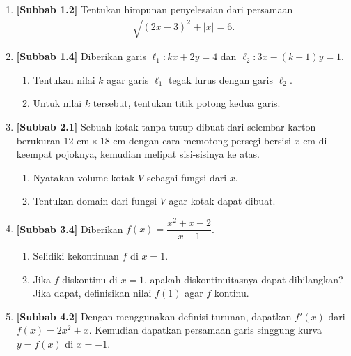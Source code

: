 \documentclass[10pt,openany,a4paper]{article}
\theoremstyle{definition}
\theoremstyle{definition}
\theoremstyle{plain}
\begin{document}
\begin{enumerate}
    \item \textbf{[Subbab 1.2]} Tentukan himpunan penyelesaian dari persamaan
    \begin{align*}
        \sqrt{(2x-3)^2}+|x|=6.
    \end{align*}

    \item \textbf{[Subbab 1.4]} Diberikan garis $\ell_1: kx+2y=4$ dan $\ell_2: 3x-(k+1)y=1$.
    \begin{enumerate}
        \item Tentukan nilai $k$ agar garis $\ell_1$ tegak lurus dengan garis $\ell_2$.
        \item Untuk nilai $k$ tersebut, tentukan titik potong kedua garis.
    \end{enumerate}

    \item \textbf{[Subbab 2.1]} Sebuah kotak tanpa tutup dibuat dari selembar karton berukuran $12\text{ cm}\times 18\text{ cm}$ dengan cara memotong persegi bersisi $x$ cm di keempat pojoknya, kemudian melipat sisi-sisinya ke atas.
    \begin{enumerate}
        \item Nyatakan volume kotak $V$ sebagai fungsi dari $x$.
        \item Tentukan domain dari fungsi $V$ agar kotak dapat dibuat.
    \end{enumerate}

    \item \textbf{[Subbab 3.4]} Diberikan $f(x)=\dfrac{x^2+x-2}{x-1}$.
    \begin{enumerate}
        \item Selidiki kekontinuan $f$ di $x=1$.
        \item Jika $f$ diskontinu di $x=1$, apakah diskontinuitasnya dapat dihilangkan? Jika dapat, definisikan nilai $f(1)$ agar $f$ kontinu.
    \end{enumerate}

    \item \textbf{[Subbab 4.2]} Dengan menggunakan definisi turunan, dapatkan $f'(x)$ dari $f(x)=2x^2+x$. Kemudian dapatkan persamaan garis singgung kurva $y=f(x)$ di $x=-1$.
\end{enumerate}
\end{document}
